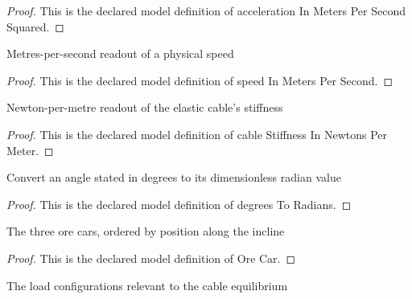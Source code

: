 \begin{proof}
  This is the declared model definition of acceleration In Meters Per Second Squared.
\end{proof}
\begin{definition}
  \label{def:physics:phyx-mini-0271:phyxminiproblems-problemphyxmini0271-speedinmeterspersecond}
  Metres-per-second readout of a physical speed
\end{definition}
\begin{proof}
  This is the declared model definition of speed In Meters Per Second.
\end{proof}
\begin{definition}
  \label{def:physics:phyx-mini-0271:phyxminiproblems-problemphyxmini0271-cablestiffnessinnewtonspermeter}
  Newton-per-metre readout of the elastic cable's stiffness
\end{definition}
\begin{proof}
  This is the declared model definition of cable Stiffness In Newtons Per Meter.
\end{proof}
\begin{definition}
  \label{def:physics:phyx-mini-0271:phyxminiproblems-problemphyxmini0271-degreestoradians}
  Convert an angle stated in degrees to its dimensionless radian value
\end{definition}
\begin{proof}
  This is the declared model definition of degrees To Radians.
\end{proof}
\begin{definition}
  \label{def:physics:phyx-mini-0271:phyxminiproblems-problemphyxmini0271-orecar}
  The three ore cars, ordered by position along the incline
\end{definition}
\begin{proof}
  This is the declared model definition of Ore Car.
\end{proof}
\begin{definition}
  \label{def:physics:phyx-mini-0271:phyxminiproblems-problemphyxmini0271-loadstage}
  The load configurations relevant to the cable equilibrium
\end{definition}
